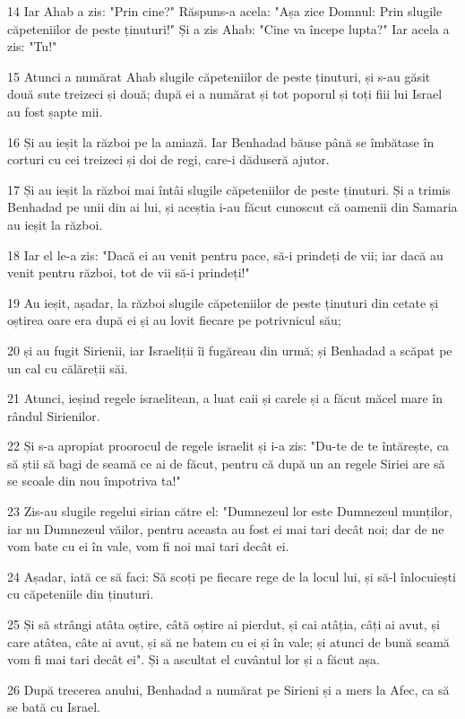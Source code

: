 \par 14 Iar Ahab a zis: "Prin cine?" Răspuns-a acela: "Așa zice Domnul: Prin slugile căpeteniilor de peste ținuturi!" Și a zis Ahab: "Cine va începe lupta?" Iar acela a zis: "Tu!"
\par 15 Atunci a numărat Ahab slugile căpeteniilor de peste ținuturi, și s-au găsit două sute treizeci și două; după ei a numărat și tot poporul și toți fiii lui Israel au fost șapte mii.
\par 16 Și au ieșit la război pe la amiază. Iar Benhadad băuse până se îmbătase în corturi cu cei treizeci și doi de regi, care-i dăduseră ajutor.
\par 17 Și au ieșit la război mai întâi slugile căpeteniilor de peste ținuturi. Și a trimis Benhadad pe unii din ai lui, și aceștia i-au făcut cunoscut că oamenii din Samaria au ieșit la război.
\par 18 Iar el le-a zis: "Dacă ei au venit pentru pace, să-i prindeți de vii; iar dacă au venit pentru război, tot de vii să-i prindeți!"
\par 19 Au ieșit, așadar, la război slugile căpeteniilor de peste ținuturi din cetate și oștirea oare era după ei și au lovit fiecare pe potrivnicul său;
\par 20 și au fugit Sirienii, iar Israeliții îi fugăreau din urmă; și Benhadad a scăpat pe un cal cu călăreții săi.
\par 21 Atunci, ieșind regele israelitean, a luat caii și carele și a făcut măcel mare în rândul Sirienilor.
\par 22 Și s-a apropiat proorocul de regele israelit și i-a zis: "Du-te de te întărește, ca să știi să bagi de seamă ce ai de făcut, pentru că după un an regele Siriei are să se scoale din nou împotriva ta!"
\par 23 Zis-au slugile regelui sirian către el: "Dumnezeul lor este Dumnezeul munților, iar nu Dumnezeul văilor, pentru aceasta au fost ei mai tari decât noi; dar de ne vom bate cu ei în vale, vom fi noi mai tari decât ei.
\par 24 Așadar, iată ce să faci: Să scoți pe fiecare rege de la locul lui, și să-l înlocuiești cu căpeteniile din ținuturi.
\par 25 Și să strângi atâta oștire, câtă oștire ai pierdut, și cai atâția, câți ai avut, și care atâtea, câte ai avut, și să ne batem cu ei și în vale; și atunci de bună seamă vom fi mai tari decât ei". Și a ascultat el cuvântul lor și a făcut așa.
\par 26 După trecerea anului, Benhadad a numărat pe Sirieni și a mers la Afec, ca să se bată cu Israel.
